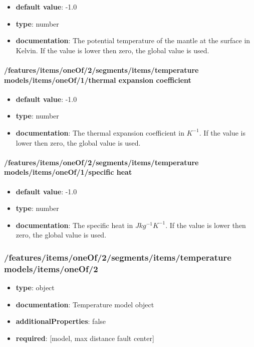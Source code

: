 \begin{itemize}\item {\bf default value}: -1.0
\item {\bf type}: number
\item {\bf documentation}: The potential temperature of the mantle at the surface in Kelvin. If the value is lower then zero, the global value is used.
\end{itemize}\paragraph{/features/items/oneOf/2/segments/items/temperature models/items/oneOf/1/thermal expansion coefficient}
\begin{itemize}\item {\bf default value}: -1.0
\item {\bf type}: number
\item {\bf documentation}: The thermal expansion coefficient in $K^{-1}$. If the value is lower then zero, the global value is used.
\end{itemize}\paragraph{/features/items/oneOf/2/segments/items/temperature models/items/oneOf/1/specific heat}
\begin{itemize}\item {\bf default value}: -1.0
\item {\bf type}: number
\item {\bf documentation}: The specific heat in $J kg^{-1} K^{-1}$. If the value is lower then zero, the global value is used.
\end{itemize}\subsubsection{/features/items/oneOf/2/segments/items/temperature models/items/oneOf/2}
\begin{itemize}\item {\bf type}: object
\item {\bf documentation}: Temperature model object
\item {\bf additionalProperties}: false
\item {\bf required}: [model, max distance fault center]\end{itemize}
